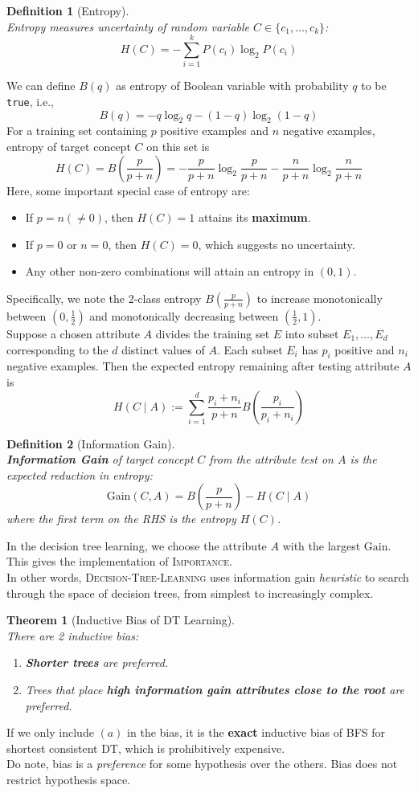 \documentclass[12pt]{article}
\newtheorem{definition}{Definition}[section]
\newtheorem{theorem}{Theorem}[section]
\theoremstyle{definition}
\begin{document}
\begin{definition}[Entropy]
\hfill\\\normalfont Entropy measures uncertainty of random variable $C\in\{c_1,\ldots, c_k\}$:
\[
H(C)=-\sum_{i=1}^k P(c_i)\log_2 P(c_i)
\]
\end{definition}
We can define $B(q)$ as entropy of Boolean variable with probability $q$ to be \texttt{true}, i.e.,
\[
B(q)=-q\log_2 q-(1-q)\log_2(1-q)
\]
For a training set containing $p$ positive examples and $n$ negative examples, entropy of target concept $C$ on this set is
\[
H(C)=B(\frac{p}{p+n})=-\frac{p}{p+n}\log_2\frac{p}{p+n}-\frac{n}{p+n}\log_2\frac{n}{p+n}
\]
Here, some important special case of entropy are:
\begin{itemize}
	\item If $p=n(\neq 0)$, then $H(C)=1$ attains its \textbf{maximum}.
	\item If $p=0$ or $n=0$, then $H(C)=0$, which suggests no uncertainty.
	\item Any other non-zero combinations will attain an entropy in $(0,1)$.
\end{itemize}
Specifically, we note the 2-class entropy $B(\frac{p}{p+n})$ to increase monotonically between $(0,\frac{1}{2})$ and monotonically decreasing between $(\frac{1}{2},1)$.\\
Suppose a chosen attribute $A$ divides the training set $E$ into subset $E_1,\ldots, E_d$ corresponding to the $d$ distinct values of $A$. Each subset $E_i$ has $p_i$ positive and $n_i$ negative examples. Then the expected entropy remaining after testing attribute $A$ is 
\[
H(C\mid A):=\sum_{i=1}^d\frac{p_i+n_i}{p+n}B(\frac{p_i}{p_i+n_i})
\]
\begin{definition}[Information Gain]
\hfill\\\normalfont \textbf{Information Gain} of target concept $C$ from the attribute test on $A$ is the expected reduction in entropy:
\[
\mathrm{Gain}(C,A)=B(\frac{p}{p+n})-H(C\mid A)
\]
where the first term on the RHS is the entropy $H(C)$.
\end{definition}
In the decision tree learning, we choose the attribute $A$ with the largest $\mathrm{Gain}$. This gives the implementation of \textsc{Importance}.\\
In other words, \textsc{Decision-Tree-Learning} uses information gain \textit{heuristic} to search through the space of decision trees, from simplest to increasingly complex.
\begin{theorem}[Inductive Bias of DT Learning]
\hfill\\\normalfont There are 2 inductive bias:
\begin{enumerate}
	\item \textbf{Shorter trees} are preferred.
	\item Trees that place \textbf{high information gain attributes close to the root} are preferred.
\end{enumerate}
\end{theorem}
If we only include $(a)$ in the bias, it is the \textbf{exact} inductive bias of BFS for shortest consistent DT, which is prohibitively expensive.\\
Do note, bias is a \textit{preference} for some hypothesis over the others. Bias does not restrict hypothesis space.
\end{document}
